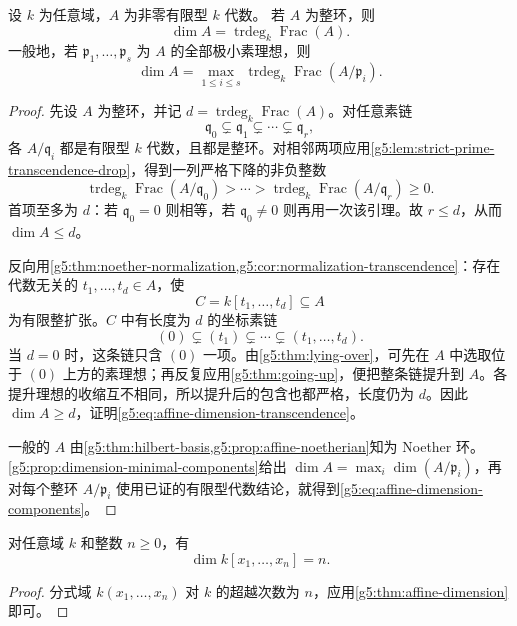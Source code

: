 \begin{theorem}\label{g5:thm:affine-dimension}
	设 \(k\) 为任意域，\(A\) 为非零有限型 \(k\) 代数。
	若 \(A\) 为整环，则
	\begin{equation}\label{g5:eq:affine-dimension-transcendence}
	\dim A=\operatorname{trdeg}_k\operatorname{Frac}(A).
	\end{equation}
	一般地，若 \(\mathfrak p_1,\ldots,\mathfrak p_s\) 为 \(A\) 的全部极小素理想，则
	\begin{equation}\label{g5:eq:affine-dimension-components}
	\dim A=\max_{1\leq i\leq s}
	\operatorname{trdeg}_k\operatorname{Frac}(A/\mathfrak p_i).
	\end{equation}
\end{theorem}
\begin{proof}
	先设 \(A\) 为整环，并记 \(d=\operatorname{trdeg}_k\operatorname{Frac}(A)\)。对任意素链
	\[
	\mathfrak q_0\subsetneq\mathfrak q_1\subsetneq\cdots\subsetneq\mathfrak q_r,
	\]
	各 \(A/\mathfrak q_i\) 都是有限型 \(k\) 代数，且都是整环。对相邻两项应用\cref{g5:lem:strict-prime-transcendence-drop}，得到一列严格下降的非负整数
	\[
	\operatorname{trdeg}_k\operatorname{Frac}(A/\mathfrak q_0)
	>\cdots>
	\operatorname{trdeg}_k\operatorname{Frac}(A/\mathfrak q_r)\geq0.
	\]
	首项至多为 \(d\)：若 \(\mathfrak q_0=0\) 则相等，若 \(\mathfrak q_0\ne0\) 则再用一次该引理。故 \(r\leq d\)，从而 \(\dim A\leq d\)。

	反向用\cref{g5:thm:noether-normalization,g5:cor:normalization-transcendence}：存在代数无关的 \(t_1,\ldots,t_d\in A\)，使
	\[
	C=k[t_1,\ldots,t_d]\subseteq A
	\]
	为有限整扩张。\(C\) 中有长度为 \(d\) 的坐标素链
	\[
	(0)\subsetneq(t_1)\subsetneq\cdots\subsetneq(t_1,\ldots,t_d).
	\]
	当 \(d=0\) 时，这条链只含 \((0)\) 一项。由\cref{g5:thm:lying-over}，可先在 \(A\) 中选取位于 \((0)\) 上方的素理想；再反复应用\cref{g5:thm:going-up}，便把整条链提升到 \(A\)。各提升理想的收缩互不相同，所以提升后的包含也都严格，长度仍为 \(d\)。因此 \(\dim A\geq d\)，证明\eqref{g5:eq:affine-dimension-transcendence}。

	一般的 \(A\) 由\cref{g5:thm:hilbert-basis,g5:prop:affine-noetherian}知为 Noether 环。\cref{g5:prop:dimension-minimal-components}给出
	\(\dim A=\max_i\dim(A/\mathfrak p_i)\)，再对每个整环 \(A/\mathfrak p_i\) 使用已证的有限型代数结论，就得到\eqref{g5:eq:affine-dimension-components}。
\end{proof}

\begin{corollary}\label{g5:cor:polynomial-dimension}
	对任意域 \(k\) 和整数 \(n\geq0\)，有
	\[
	\dim k[x_1,\ldots,x_n]=n.
	\]
\end{corollary}
\begin{proof}
	分式域 \(k(x_1,\ldots,x_n)\) 对 \(k\) 的超越次数为 \(n\)，应用\cref{g5:thm:affine-dimension}即可。
\end{proof}

